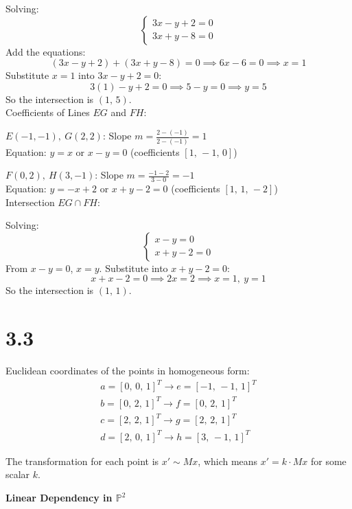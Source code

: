 \documentclass[12pt]{article}
\begin{document}
    Solving:
    \[
    \begin{cases}
    3x - y + 2 = 0 \\
    3x + y - 8 = 0
    \end{cases}
    \]
    Add the equations:
    \[
    (3x - y + 2) + (3x + y - 8) = 0 \implies 6x - 6 = 0 \implies x = 1
    \]
    Substitute $x = 1$ into $3x - y + 2 = 0$:
    \[
    3(1) - y + 2 = 0 \implies 5 - y = 0 \implies y = 5
    \]
    So the intersection is $(1,\,5)$.
    \\

    Coefficients of Lines $EG$ and $FH$:

    $E(-1, -1),\ G(2, 2)$: Slope $m = \frac{2 - (-1)}{2 - (-1)} = 1$ \\
    Equation: $y = x$ or $x - y = 0$ (coefficients $[1,\, -1,\, 0]$)

    $F(0, 2),\ H(3, -1)$: Slope $m = \frac{-1 - 2}{3 - 0} = -1$ \\
    Equation: $y = -x + 2$ or $x + y - 2 = 0$ (coefficients $[1,\, 1,\, -2]$)
    \\

    Intersection $EG \cap FH$:

    Solving:
    \[
    \begin{cases}
    x - y = 0 \\
    x + y - 2 = 0
    \end{cases}
    \]
    From $x - y = 0$, $x = y$. Substitute into $x + y - 2 = 0$:
    \[
    x + x - 2 = 0 \implies 2x = 2 \implies x = 1,\ y = 1
    \]
    So the intersection is $(1,\,1)$.

    \section*{3.3}

    Euclidean coordinates of the points in homogeneous form:
    \begin{align*}
        a = [0,\,0,\,1]^T \rightarrow e = [-1,\,-1,\,1]^T \\
        b = [0,\,2,\,1]^T \rightarrow f = [0,\,2,\,1]^T \\
        c = [2,\,2,\,1]^T \rightarrow g = [2,\,2,\,1]^T \\
        d = [2,\,0,\,1]^T \rightarrow h = [3,\,-1,\,1]^T
    \end{align*}

    The transformation for each point is $x' \sim Mx$, which means $x' = k \cdot Mx$ for some scalar $k$.

    \textbf{Linear Dependency in $\mathbb{P}^2$}
\end{document}
